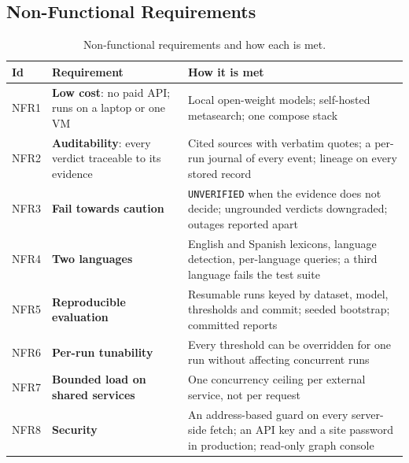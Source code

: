 
\subsection{Non-Functional Requirements}

\begin{table}[ht]
\centering
\small
\caption{Non-functional requirements and how each is met.}
\label{tab:nonfunctional-requirements}
\begin{tabularx}{\linewidth}{@{}lXX@{}}
\toprule
\textbf{Id} & \textbf{Requirement} & \textbf{How it is met} \\
\midrule
NFR1 & \textbf{Low cost}: no paid API; runs on a laptop or one VM &
Local open-weight models; self-hosted metasearch; one compose stack \\
NFR2 & \textbf{Auditability}: every verdict traceable to its evidence &
Cited sources with verbatim quotes; a per-run journal of every event;
lineage on every stored record \\
NFR3 & \textbf{Fail towards caution} & \texttt{UNVERIFIED} when the
evidence does not decide; ungrounded verdicts downgraded; outages
reported apart \\
NFR4 & \textbf{Two languages} & English and Spanish lexicons,
language detection, per-language queries; a third language fails the
test suite \\
NFR5 & \textbf{Reproducible evaluation} & Resumable runs keyed by
dataset, model, thresholds and commit; seeded bootstrap; committed
reports \\
NFR6 & \textbf{Per-run tunability} & Every threshold can be overridden
for one run without affecting concurrent runs \\
NFR7 & \textbf{Bounded load on shared services} & One concurrency
ceiling per external service, not per request \\
NFR8 & \textbf{Security} & An address-based guard on every server-side
fetch; an API key and a site password in production; read-only graph
console \\
\bottomrule
\end{tabularx}
\end{table}
